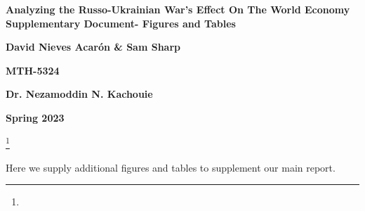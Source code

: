 \documentclass[11pt,regno]{amsart}
\theoremstyle{plain}
\numberwithin{equation}{section}
\begin{document}
\setcounter{page}{1}

\title{}
\author{}
\thispagestyle{plain}
\begin{center}
    \Large
    \textbf{Analyzing the Russo-Ukrainian War's Effect On The World Economy Supplementary Document- Figures and Tables}
        
    \vspace{0.4cm}
    \large
    \textbf{David Nieves Acarón \& Sam Sharp}
        
    \vspace{0.4cm}
    \textbf{MTH-5324}
    
    \vspace{0.4cm}
    \textbf{Dr. Nezamoddin N. Kachouie}

    \vspace{0.4cm}
    \textbf{Spring 2023}
\end{center}
\thanks{}








\maketitle %
\doublespacing 

Here we supply additional figures and tables to supplement our main report.
\end{document}
